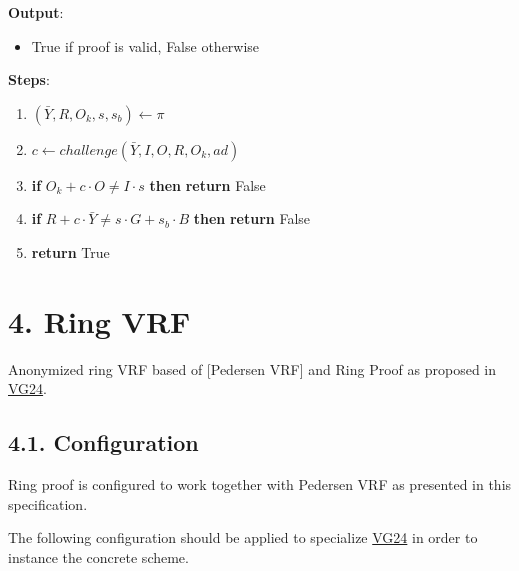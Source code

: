 \documentclass[
]{article}
\providecommand{\tightlist}{%
  \setlength{\itemsep}{0pt}\setlength{\parskip}{0pt}}
\begin{document}
\textbf{Output}:

\begin{itemize}
\tightlist
\item
  True if proof is valid, False otherwise
\end{itemize}

\textbf{Steps}:

\begin{enumerate}
\def\labelenumi{\arabic{enumi}.}
\tightlist
\item
  \((\bar{Y}, R, O_k, s, s_b) \leftarrow \pi\)
\item
  \(c \leftarrow challenge(\bar{Y}, I, O, R, O_k, ad)\)
\item
  \textbf{if} \(O_k + c \cdot O \neq I \cdot s\) \textbf{then}
  \textbf{return} False
\item
  \textbf{if} \(R + c \cdot \bar{Y} \neq s \cdot G + s_b \cdot B\)
  \textbf{then} \textbf{return} False
\item
  \textbf{return} True
\end{enumerate}

\hypertarget{ring-vrf}{%
\section{4. Ring VRF}\label{ring-vrf}}

Anonymized ring VRF based of {[}Pedersen VRF{]} and Ring Proof as
proposed in \href{https://github.com/davxy/ring-proof-spec}{VG24}.

\hypertarget{configuration-2}{%
\subsection{4.1. Configuration}\label{configuration-2}}

Ring proof is configured to work together with Pedersen VRF as presented
in this specification.

The following configuration should be applied to specialize
\href{https://github.com/davxy/ring-proof-spec}{VG24} in order to
instance the concrete scheme.
\end{document}
